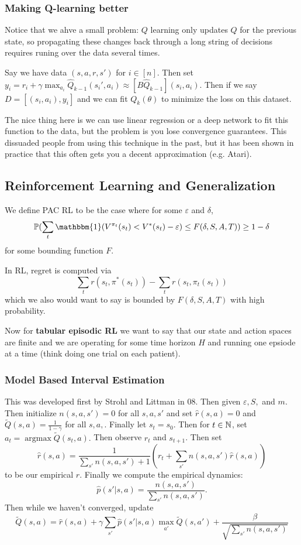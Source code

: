 \documentclass[12pt]{article}
\DeclareMathOperator*{\argmax}{argmax}
\begin{document}
\subsubsection{Making Q-learning better}
Notice that we ahve a small problem: $Q$ learning only updates $Q$ for the previous state, so propagating these changes back through a long string of decisions requires runing over the data several times.

Say we have data $(s,a,r,s')$ for $i\in[n]$. Then set $y_i=r_i+\gamma\max_{a_i}\hat Q_{k-1}(s_i',a_i)\approx[B\hat Q_{k-1}](s_i,a_i).$
Then if we say $D=[(s_i,a_i),y_i]$ and we can fit $Q_k(\theta)$ to minimize the loss on this dataset.

The nice thing here is we can use linear regression or a deep network to fit this function to the data, but the problem is you lose convergence guarantees. This dissuaded people from using this technique in the past, but it has been shown in practice that this often gets you a decent approximation (e.g. Atari).
\subsection{Reinforcement Learning and Generalization}
We define PAC RL to be the case where for some $\varepsilon$ and $\delta$,
\[\bbP(\sum_t \mathbbm{1}(V^{\pi_t}(s_t)<V^\ast(s_t)-\varepsilon)\le F(\delta, S, A, T))\ge 1-\delta\]
for some bounding function $F$. 

In RL, regret is computed via
\[\sum_t r(s_t,\pi^\ast(s_t))-\sum_tr(s_t,\pi_t(s_t))\]
which we also would want to say is bounded by $F(\delta,S,A,T)$ with high probability.

Now for \textbf{tabular episodic RL} we want to say that our state and action spaces are finite and we are operating for some time horizon $H$ and running one epsiode at a time (think doing one trial on each patient).

\subsubsection{Model Based Interval Estimation}
This was developed first by Strohl and Littman in 08. Then given $\varepsilon, S,$ and $m$. Then initialize $n(s,a,s')=0$ for all $s,a,s'$ and set $\hat r(s,a)=0$ and $\tilde Q(s,a)=\frac{1}{1-\gamma}$ for all $s,a,$.
Finally let $s_t=s_0$. Then for $t\in\mathbb{N}$, set $a_t=\argmax \tilde Q(s_t,a).$ Then observe $r_t$ and $s_{t+1}$. Then set 
\[\hat r(s,a)=\frac{1}{\sum_{s'}n(s,a,s')+1}\left(r_t+\sum_{s'}n(s,a,s')\hat r(s,a)\right)\]
to be our empirical $r$. Finally we compute the empirical dynamics:
\[\hat p(s'|s,a)=\frac{n(s,a,s')}{\sum_{s'}n(s,a,s')}.\]
Then while we haven't converged, update 
\[\tilde Q(s,a)=\hat r(s,a)+\gamma\sum_{s'}\hat p(s'|s,a)\max_{a'}\tilde Q(s,a')+\frac{\beta}{\sqrt{\sum_{s'}n(s,a,s')}}\]
\end{document}
